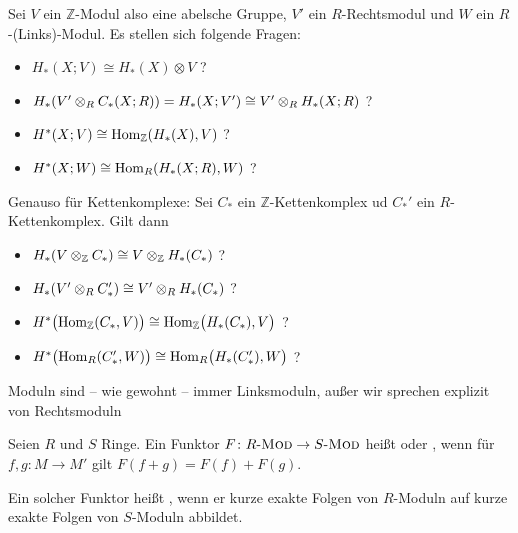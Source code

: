 \begin{frage}[{name=[{Isomorphismen von Kohomologiemoduln}]}]
	Sei $V$ ein $\mathbb{Z}$-Modul also eine abelsche Gruppe, $V'$ ein $R$-Rechtsmodul und  $W$ ein $R$-(Links)-Modul.
	Es stellen sich folgende Fragen:
	\begin{itemize}
		\item $H_*(X;V) \cong H_*(X) \otimes V$ ?
		\item $H_* \enbrace*{V' \otimes_R C_*(X;R)}= H_*(X;V') \cong V' \otimes_R H_*(X;R)$ ?
		\item $H^*(X;V) \cong \Hom_\mathbb{Z}(H_*(X),V)$ ?
		\item $H^*(X;W) \cong \Hom_R \enbrace*{H_*(X;R),W}$ ?
	\end{itemize}
	Genauso für Kettenkomplexe: Sei $C_*$ ein $\mathbb{Z}$-Kettenkomplex ud $C_*'$ ein $R$-Kettenkomplex. Gilt dann
	\begin{itemize}
		\item $H_* \enbrace*{V \otimes_\mathbb{Z} C_*} \cong V \otimes _\mathbb{Z} H_*(C_*)$ ?
		\item $H_* \enbrace*{V' \otimes_R C_*'} \cong V' \otimes_R H_*(C_*)$ ?
		\item $H^* \enbrace[\big]{\Hom_\mathbb{Z}(C_*,V)} \cong \Hom_\mathbb{Z} \enbrace[\big]{H_*(C_*),V}$ ?
		\item $H^*\enbrace[\big]{\Hom_R(C_*',W)} \cong \Hom_R \enbrace[\big]{H_*(C_*'),W}$ ?
	\end{itemize}
\end{frage}

\begin{konvention}[{name=[Links- und Rechtsmoduln]}]
	Moduln sind -- wie gewohnt -- immer Linksmoduln, außer wir sprechen explizit von Rechtsmoduln
\end{konvention}

\begin{definition}[{name=[{lineare und exakte Funktoren}]}]
	Seien $R$ und $S$ Ringe.
	Ein Funktor $F\colon \Mod{R} \to \Mod{S}$ heißt  oder , wenn für $f,g \colon M \to M'$ gilt $F(f + g)= F(f) + F(g)$.
	
	Ein solcher Funktor heißt , wenn er kurze exakte Folgen von $R$-Moduln auf kurze exakte Folgen von $S$-Moduln abbildet.
\end{definition}

